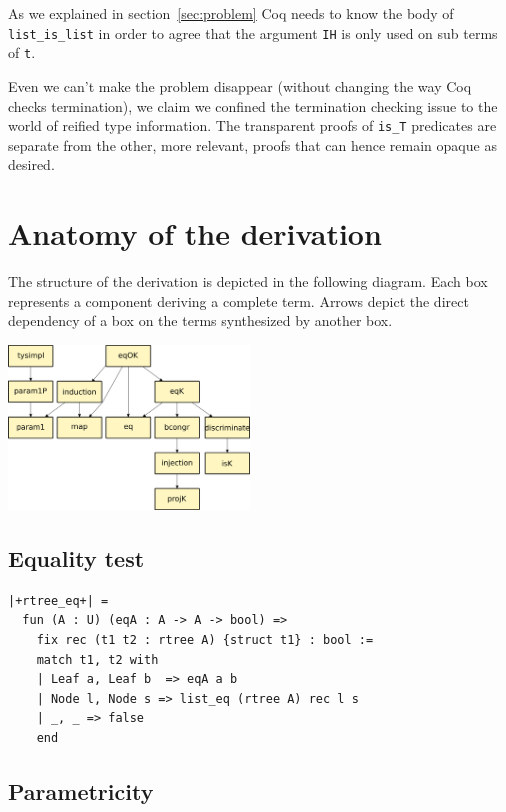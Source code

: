 \documentclass[sigplan,10pt,review]{acmart}\settopmatter{printfolios=true,printccs=false,printacmref=false}
\begin{document}
As we explained in section~\ref{sec:problem} Coq needs to know the
body of  \lstinline+list_is_list+ in order to agree that the argument
\lstinline+IH+ is only used on sub terms of \lstinline+t+.

Even we can't make the problem disappear (without changing the way Coq
checks termination), we claim we confined the termination checking issue
to the world of reified type information. The transparent proofs of 
\lstinline+is_T+ predicates are separate from the other, more
relevant, proofs that can hence remain opaque as desired.

\section{Anatomy of the derivation} %
\label{sec:code}

The structure of the derivation is depicted in the following diagram.
Each box represents a component deriving a complete term.
Arrows depict the direct dependency of a box on the terms synthesized
by another box.

\includegraphics[width=0.48\textwidth]{derive.png}


\subsection{Equality test} %



\begin{lstlisting}
|+rtree_eq+| = 
  fun (A : U) (eqA : A -> A -> bool) =>
    fix rec (t1 t2 : rtree A) {struct t1} : bool :=
    match t1, t2 with
    | Leaf a, Leaf b  => eqA a b
    | Node l, Node s => list_eq (rtree A) rec l s
    | _, _ => false
    end
\end{lstlisting}


\subsection{Parametricity} %
\end{document}
